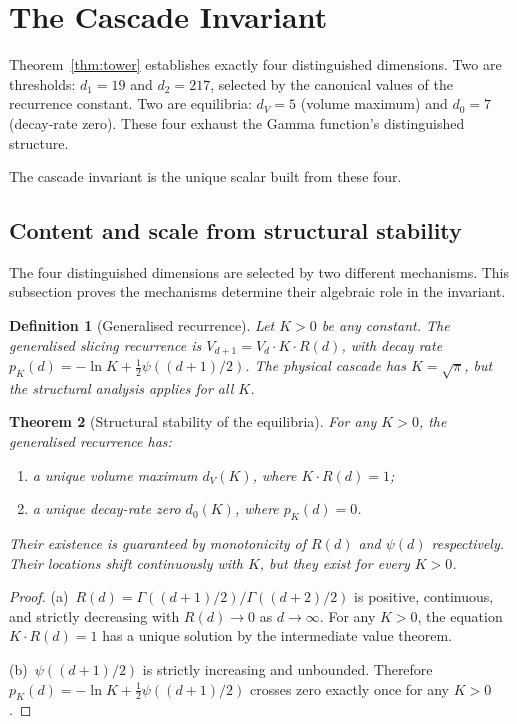 \documentclass[11pt,a4paper]{article}
\newtheorem{theorem}{Theorem}[section]
\newtheorem{definition}[theorem]{Definition}
\begin{document}
\section{The Cascade Invariant}

Theorem~\ref{thm:tower} establishes exactly four distinguished dimensions.
Two are thresholds: $d_1 = 19$ and $d_2 = 217$, selected by the canonical
values of the recurrence constant. Two are equilibria: $d_V = 5$ (volume
maximum) and $d_0 = 7$ (decay-rate zero). These four exhaust the Gamma
function's distinguished structure.

The cascade invariant is the unique scalar built from these four.

\subsection{Content and scale from structural stability}

The four distinguished dimensions are selected by two different
mechanisms. This subsection proves the mechanisms determine their algebraic
role in the invariant.

\begin{definition}[Generalised recurrence]\label{def:general}
Let $K > 0$ be any constant. The generalised slicing recurrence is
$V_{d+1} = V_d\cdot K\cdot R(d)$, with decay rate
$p_K(d) = -\ln K + \tfrac{1}{2}\psi((d+1)/2)$. The physical cascade has
$K = \sqrt{\pi}$, but the structural analysis applies for all $K$.
\end{definition}

\begin{theorem}[Structural stability of the equilibria]\label{thm:stable}
For any $K > 0$, the generalised recurrence has:
\begin{enumerate}
\item[(a)] a unique volume maximum $d_V(K)$, where $K\cdot R(d) = 1$;
\item[(b)] a unique decay-rate zero $d_0(K)$, where $p_K(d) = 0$.
\end{enumerate}
Their existence is guaranteed by monotonicity of $R(d)$ and $\psi(d)$
respectively. Their locations shift continuously with $K$, but they
exist for every $K > 0$.
\end{theorem}

\begin{proof}
(a)~$R(d) = \Gamma((d+1)/2)/\Gamma((d+2)/2)$ is positive, continuous, and
strictly decreasing with $R(d)\to 0$ as $d\to\infty$. For any $K > 0$,
the equation $K\cdot R(d) = 1$ has a unique solution by the intermediate
value theorem.

(b)~$\psi((d+1)/2)$ is strictly increasing and unbounded. Therefore
$p_K(d) = -\ln K + \frac{1}{2}\psi((d+1)/2)$ crosses zero exactly once
for any $K > 0$.
\end{proof}
\end{document}
